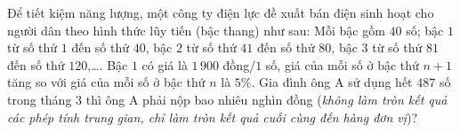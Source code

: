 \begin{ex}%
	Để tiết kiệm năng lượng, một công ty điện lực đề xuất bán điện sinh hoạt cho người dân theo hình thức lũy tiến (bậc thang) như sau: Mỗi bậc gồm $40$ số; bậc $1$ từ số thứ $1$ đến số thứ $40$, bậc $2$ từ số thứ $41$ đến số thứ $80$, bậc $3$ từ số thứ $81$ đến số thứ $120$,\ldots. Bậc $1$ có giá là $1\,900$ đồng/$1$ số, giá của mỗi số ở bậc thứ $n+1$ tăng so với giá của mỗi số ở bậc thứ $n$ là $5\%$. Gia đình ông A sử dụng hết $487$ số trong tháng $3$ thì ông A phải nộp bao nhiêu nghìn đồng (\textit{không làm tròn kết quả các phép tính trung gian, chỉ làm tròn kết quả cuối cùng đến hàng đơn vị})?
	\par {}
\end{ex}



%
%	
%

